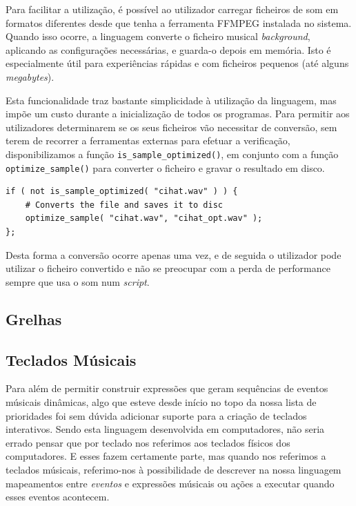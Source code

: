Para facilitar a utilização, é possível ao utilizador carregar ficheiros de som em formatos diferentes desde que tenha a ferramenta FFMPEG instalada no sistema. Quando isso ocorre, a linguagem converte o ficheiro musical \textit{background}, aplicando as configurações necessárias, e guarda-o depois em memória. Isto é especialmente útil para experiências rápidas e com ficheiros pequenos (até alguns \textit{megabytes}).

Esta funcionalidade traz bastante simplicidade à utilização da linguagem, mas impõe um custo durante a inicialização de todos os programas. Para permitir aos utilizadores determinarem se os seus ficheiros vão necessitar de conversão, sem terem de recorrer a ferramentas externas para efetuar a verificação, disponibilizamos a função \texttt{is\_sample\_optimized()}, em conjunto com a função \texttt{optimize\_sample()} para converter o ficheiro e gravar o resultado em disco.

\begin{lstlisting}[caption={Verificar se um ficheiro de audio está optimizado, e convertê-lo caso contrário}]
if ( not is_sample_optimized( "cihat.wav" ) ) {
    # Converts the file and saves it to disc
    optimize_sample( "cihat.wav", "cihat_opt.wav" );
};
\end{lstlisting}

Desta forma a conversão ocorre apenas uma vez, e de seguida o utilizador pode utilizar o ficheiro convertido e não se preocupar com a perda de performance sempre que usa o som num \textit{script}.

\subsection{Grelhas}

\subsection{Teclados Músicais}
Para além de permitir construir expressões que geram sequências de eventos músicais dinâmicas, algo que esteve desde início no topo da nossa lista de prioridades foi sem dúvida adicionar suporte para a criação de teclados interativos. Sendo esta linguagem desenvolvida em computadores, não seria errado pensar que por teclado nos referimos aos teclados físicos dos computadores. E esses fazem certamente parte, mas quando nos referimos a teclados músicais, referimo-nos à possibilidade de descrever na nossa linguagem mapeamentos entre \textit{eventos} e expressões músicais ou ações a executar quando esses eventos acontecem.

